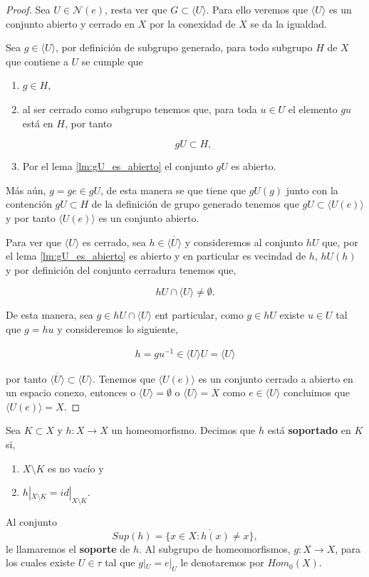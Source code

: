 \begin{proof}
Sea $U \in \mathcal{N}(e)$, resta ver que $G \subset \langle U \rangle$. Para ello veremos que $\langle U \rangle$ es un conjunto abierto y cerrado en $X$ por la conexidad de $X$ se da la igualdad.

 Sea $g \in \langle U \rangle$, por definición de subgrupo generado, para todo subgrupo $H$ de $X$ que contiene a $U$ se cumple  que 
\begin{enumerate}
	\item $g \in H$,
	\item al ser cerrado como subgrupo tenemos que, para toda $u \in U$ el elemento $gu$ está en $H$, por tanto
 
 $$gU \subset H,$$
 
 \item Por el lema \ref{lm:gU_es_abierto} el conjunto $gU$ es abierto.
\end{enumerate} 
 
 
Más aún, $g=ge \in gU$, de esta manera se que tiene que  $gU(g)$ junto con la contención $gU \subset H$ de la definición de grupo generado tenemos que  $gU \subset \langle U(e) \rangle$ y por tanto $\langle U(e) \rangle$ es un conjunto abierto.

Para ver que $\langle U \rangle$ es cerrado, sea $h \in \overline{\langle U \rangle}$ y consideremos al conjunto $hU$ que, por el lema \ref{lm:gU_es_abierto} es abierto y en particular es vecindad de $h$, $hU(h)$ y por definición del conjunto cerradura tenemos que, 

$$hU \cap \langle U \rangle \neq \emptyset.$$

 De esta manera, sea $g \in hU\cap \langle U \rangle$ ent particular, como $g \in hU$ existe $u \in U$ tal que $g=hu$ y consideremos lo siguiente, 

\begin{align*}
h=gu^{-1} \in  \langle U \rangle U =\langle U \rangle
\end{align*} 
 
 por tanto $\overline{\langle U \rangle} \subset \langle U \rangle.$ Tenemos que $\langle U(e) \rangle$ es un conjunto cerrado a abierto en un espacio conexo, entonces o $\langle U \rangle=\emptyset$ o $\langle U \rangle=X$ como $e \in \langle U \rangle$ concluimos que $\langle U(e) \rangle = X.$
\end{proof}



\begin{df}
Sea $K \subset X$ y $h:X \to X$ un homeomorfismo. Decimos que $h$ está  \textbf{soportado} en $K$ si,
\begin{enumerate}
	\item $X \setminus K$ es no vacío y
	\item $h|_{X \setminus K}=id|_{X \setminus K}$.
\end{enumerate}	
 Al conjunto $$Sup(h)=\overline{\{x \in X : h(x)\neq x \}},$$  le llamaremos el \textbf{soporte} de $h$. Al subgrupo de homeomorfismos, $g:X \to X$, para los cuales existe $U \in \tau$ tal que $g|_U=e|_U$ le denotaremos por $Hom_0(X)$.
\end{df}

